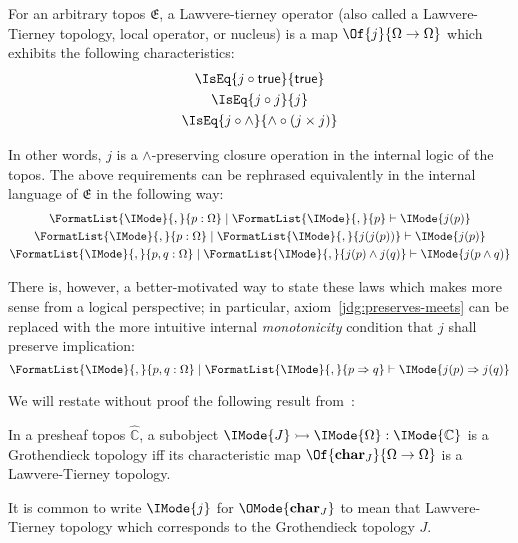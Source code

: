 \documentclass{article}
\newcommand\Char[1]{\mathbf{char}_{#1}}
\newcommand\Psh[1]{\widehat{#1}}
\newcommand\IsSubobject[3]{\IMode{#1}\rightarrowtail\IMode{#2}:\IMode{#3}}
\newcommand\True{\mathsf{true}}
\begin{document}
\newcommand\Seq[3]{\FormatList{\IMode}{,}{#1}\mid\FormatList{\IMode}{,}{#2}\vdash\IMode{#3}}

\begin{definition}\label{def:lawvere-tierney}
  For an arbitrary topos $\mathfrak{E}$, a Lawvere-tierney operator
  (also called a Lawvere-Tierney topology, local operator, or nucleus)
  is a map $\Of{j}{\Omega\to\Omega}$ which exhibits the following
  characteristics:
  \begin{gather}
    \IsEq{j\circ\True}{\True}
    \label{eq:preserves-true}
    \\
    \IsEq{j\circ j}{j}
    \label{eq:idempotency}
    \\
    \IsEq{j\circ\land}{\land\circ(j\times j)}
    \label{eq:preserves-meets}
  \end{gather}
\end{definition}


In other words, $j$ is a $\land$-preserving closure operation in the
internal logic of the topos. The above requirements can be rephrased
equivalently in the internal language of $\mathfrak{E}$ in the
following way:
\begin{gather}
  \Seq{p:\Omega}{p}{j(p)}
  \\
  \Seq{p:\Omega}{j(j(p))}{j(p)}
  \label{jdg:idempotency}
  \\
  \Seq{p,q:\Omega}{j(p)\land j(q)}{j(p\land q)}
  \label{jdg:preserves-meets}
\end{gather}


There is, however, a better-motivated way to state these laws which
makes more sense from a logical perspective; in particular,
axiom~\ref{jdg:preserves-meets} can be replaced with the more
intuitive internal \emph{monotonicity} condition that $j$ shall
preserve implication:
\begin{equation}
  \Seq{p,q:\Omega}{p\Rightarrow q}{j(p)\Rightarrow j(q)}
  \label{jdg:monotonicity}
\end{equation}

We will restate without proof the following result
from~\cite{maclane-moerdijk:1992}:
\begin{prop}
  In a presheaf topos $\Psh{\mathbb{C}}$, a subobject
  $\IsSubobject{J}{\Omega}{\mathbb{C}}$ is a Grothendieck topology iff
  its characteristic map $\Of{\Char{J}}{\Omega\to\Omega}$ is a
  Lawvere-Tierney topology.
\end{prop}

\begin{notation}
  It is common to write $\IMode{j}$ for $\OMode{\Char{J}}$ to mean
  that Lawvere-Tierney topology which corresponds to the Grothendieck
  topology $J$.
\end{notation}
\end{document}
